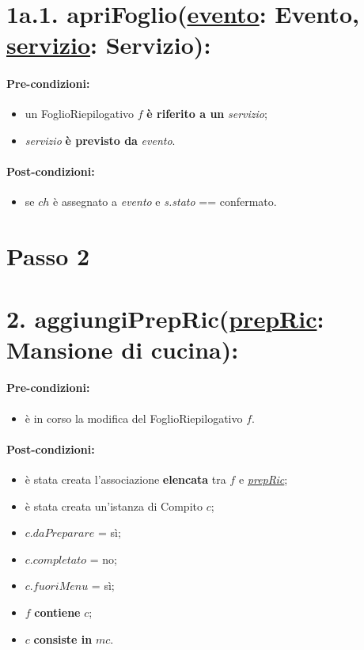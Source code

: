 \section*{1a.1. apriFoglio(\underline{evento}: Evento, \underline{servizio}: Servizio):}

\paragraph{Pre-condizioni:}

\begin{itemize}
  \item un FoglioRiepilogativo $f$ \textbf{è riferito a un} \textit{servizio};
  \item \textit{servizio} \textbf{è previsto da} \textit{evento}.
\end{itemize}

\paragraph{Post-condizioni:}

\begin{itemize}
  \item se $ch$ è assegnato a \textit{evento} e \textit{s.stato} == confermato.
\end{itemize}

\section{Passo 2}

\section*{2. aggiungiPrepRic(\underline{prepRic}: Mansione di cucina):}

\paragraph{Pre-condizioni:}

\begin{itemize}
  \item è in corso la modifica del FoglioRiepilogativo $f$.
\end{itemize}

\paragraph{Post-condizioni:}

\begin{itemize}
  \item è stata creata l'associazione \textbf{elencata} tra $f$ e \underline{\textit{prepRic}};
  \item è stata creata un'istanza di Compito $c$;
  \item $c.daPreparare$ = sì;
  \item $c.completato$ = no;
  \item $c.fuoriMenu$ = sì;
  \item $f$ \textbf{contiene} $c$;
  \item $c$ \textbf{consiste in} $mc$.
\end{itemize}

